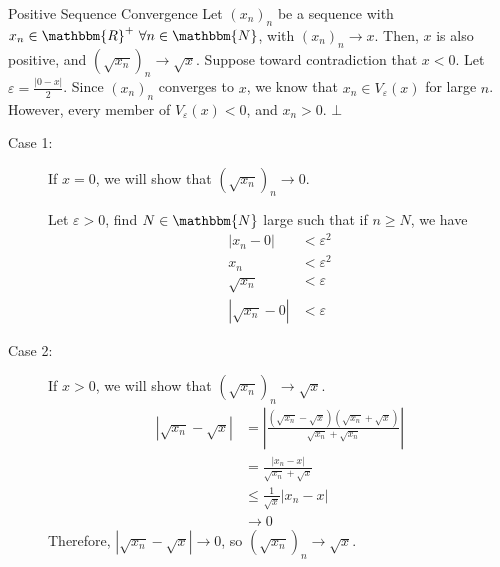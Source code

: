\documentclass[10pt]{extarticle}
\newcommand{\N}{\mathbbm{N}}
\newcommand{\R}{\mathbbm{R}}
\begin{document}
  \begin{problem}{Positive Sequence Convergence}
    Let $(x_n)_n$ be a sequence with $x_n\in\R^+~\forall n\in\N$, with $(x_n)_n \rightarrow x$. Then, $x$ is also positive, and $\left(\sqrt{x_n}\right)_n \rightarrow \sqrt{x}$.
    \tcblower
    Suppose toward contradiction that $x < 0$. Let $\varepsilon = \frac{|0-x|}{2}$. Since $(x_n)_n$ converges to $x$, we know that $x_n\in V_{\varepsilon}(x)$ for large $n$. However, every member of $V_{\varepsilon}(x) < 0$, and $x_n > 0$. $\bot$
    \begin{description}
      \item[Case 1:] If $x = 0$, we will show that $\left(\sqrt{x_n}\right)_n \rightarrow 0$.\newline

        Let $\varepsilon > 0$, find $N\in\N$ large such that if $n\geq N$, we have
        \begin{align*}
          |x_n - 0| &< \varepsilon^2\\
          x_n &< \varepsilon^2\\
          \sqrt{x_n} &< \varepsilon\\
          |\sqrt{x_n} - 0| &< \varepsilon
        \end{align*}
      \item[Case 2:] If $x > 0$, we will show that $\left(\sqrt{x_n}\right)_n \rightarrow \sqrt{x}$.
        \begin{align*}
          \left|\sqrt{x_n} - \sqrt{x}\right| &= \left|\frac{\left(\sqrt{x_n} - \sqrt{x}\right)\left(\sqrt{x_n} + \sqrt{x}\right)}{\sqrt{x_n} + \sqrt{x_n}}\right|\\
                                             &= \frac{|x_n-x|}{\sqrt{x_n} + \sqrt{x}}\\
                                             &\leq \frac{1}{\sqrt{x}} |x_n - x|\\
                                             &\rightarrow 0
        \end{align*}
        Therefore, $|\sqrt{x_n}-\sqrt{x}| \rightarrow 0$, so $\left(\sqrt{x_n}\right)_n \rightarrow \sqrt{x}$.
    \end{description}
  \end{problem}
\end{document}
